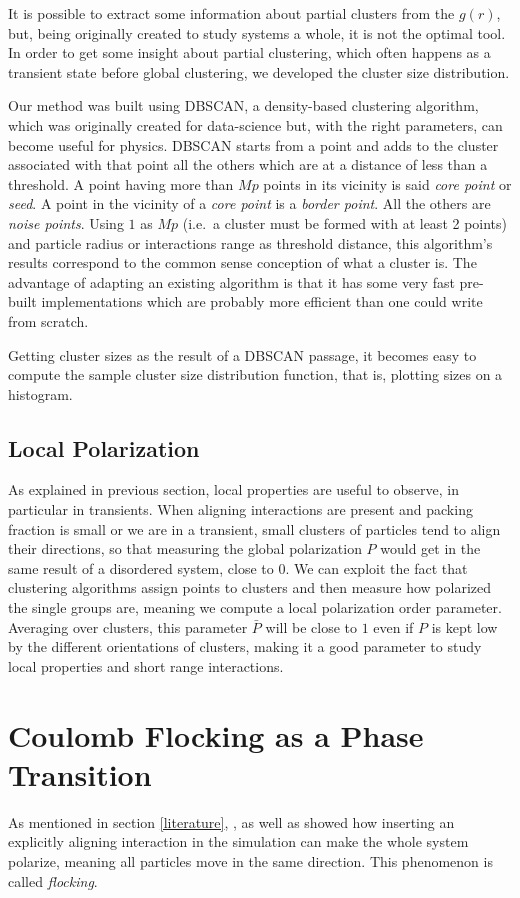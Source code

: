 \documentclass[../../master_thesis_np.tex]{subfiles}
\begin{document}
		It is possible to extract some information about partial clusters from the $g(r)$, but, being originally created to study systems a whole, it is not the optimal tool. In order to get some insight about partial clustering, which often happens as a transient state before global clustering, we developed the cluster size distribution. 
		
		Our method was built using DBSCAN, a density-based clustering algorithm, which was originally created for data-science but, with the right parameters, can become useful for physics. DBSCAN starts from a point and adds to the cluster associated with that point all the others which are at a distance of less than a threshold. A point having more than $Mp$ points in its vicinity is said \emph{core point} or \emph{seed}. A point in the vicinity of a \emph{core point} is a \emph{border point}. All the others are \emph{noise points}. Using $1$ as $Mp$ (i.e.\ a cluster must be formed with at least 2 points) and particle radius or interactions range as threshold distance, this algorithm's results correspond to the common sense conception of what a cluster is. The advantage of adapting an existing algorithm is that it has some very fast pre-built implementations which are probably more efficient than one could write from scratch.
		
		Getting cluster sizes as the result of a DBSCAN passage, it becomes easy to compute the sample cluster size distribution function, that is, plotting sizes on a histogram.
		\subsection{Local Polarization}
		As explained in previous section, local properties are useful to observe, in particular in transients. When aligning interactions are present and packing fraction is small or we are in a transient, small clusters of particles tend to align their directions, so that measuring the global polarization $P$ would get in the same result of a disordered system, close to $0$. We can exploit the fact that clustering algorithms assign points to clusters and then measure how polarized the single groups are, meaning we compute a local polarization order parameter. Averaging over clusters, this parameter $\bar{P}$ will be close to $1$ even if $P$ is kept low by the different orientations of clusters, making it a good parameter to study local properties and short range interactions.
		
		\section{Coulomb Flocking as a Phase Transition}
		As mentioned in section \ref{literature}, \citeauthor{martin-gomez_collective_2018}, as well as \citeauthor{negi_emergent_2022} showed how inserting an explicitly aligning interaction in the simulation can make the whole system polarize, meaning all particles move in the same direction. This phenomenon is called \emph{flocking}.
		
\end{document}
